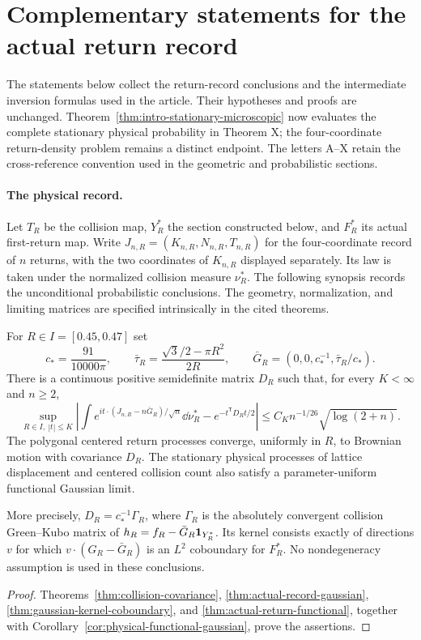 \section{Complementary statements for the actual return record}
\label{app:retained-return-statements}
The statements below collect the return-record conclusions and the
intermediate inversion formulas used in the article. Their hypotheses
and proofs are unchanged. Theorem~\ref{thm:intro-stationary-microscopic}
now evaluates the complete stationary physical probability in Theorem X;
the four-coordinate return-density problem remains a distinct endpoint.
The letters A--X retain the cross-reference convention used in the
geometric and probabilistic sections.

\paragraph{The physical record.}
Let $T_R$ be the collision map, $Y_R^*$ the section constructed below,
and $F_R^*$ its actual first-return map. Write
$J_{n,R}=(K_{n,R},N_{n,R},T_{n,R})$ for the four-coordinate record of
$n$ returns, with the two coordinates of $K_{n,R}$ displayed separately.
Its law is taken under the normalized collision measure $\nu_R^*$.
The following synopsis records the unconditional probabilistic
conclusions. The geometry, normalization, and limiting matrices are
specified intrinsically in the cited theorems.

\begin{maintheorem}
\label{thm:intro-gaussian}
For $R\in I=[0.45,0.47]$ set
\[
 c_* = \frac{91}{10000\pi},\qquad
 \bar\tau_R=\frac{\sqrt3/2-\pi R^2}{2R},\qquad
 \bar G_R=(0,0,c_*^{-1},\bar\tau_R/c_*).
\]
There is a continuous positive semidefinite matrix $D_R$ such that,
for every $K<\infty$ and $n\ge2$,
\[
 \sup_{R\in I,\ |t|\le K}
 \left|\int e^{it\cdot(J_{n,R}-n\bar G_R)/\sqrt n}\dd\nu_R^*
              -e^{-t^{\mathsf T}D_Rt/2}\right|
 \le C_Kn^{-1/26}\sqrt{\log(2+n)}.
\]
The polygonal centered return processes converge, uniformly in $R$,
to Brownian motion with covariance $D_R$. The stationary physical
processes of lattice displacement and centered collision count also
satisfy a parameter-uniform functional Gaussian limit.

More precisely, $D_R=c_*^{-1}\Gamma_R$, where $\Gamma_R$ is the
absolutely convergent collision Green--Kubo matrix of
$h_R=f_R-\bar G_R\mathbf1_{Y_R^*}$. Its kernel consists exactly of directions
$v$ for which $v\cdot(G_R-\bar G_R)$ is an $L^2$ coboundary for
$F_R^*$. No nondegeneracy assumption is used in these conclusions.
\end{maintheorem}
\begin{proof}
Theorems~\ref{thm:collision-covariance},
\ref{thm:actual-record-gaussian}, \ref{thm:gaussian-kernel-coboundary},
and \ref{thm:actual-return-functional}, together with
Corollary~\ref{cor:physical-functional-gaussian}, prove the assertions.
\end{proof}

